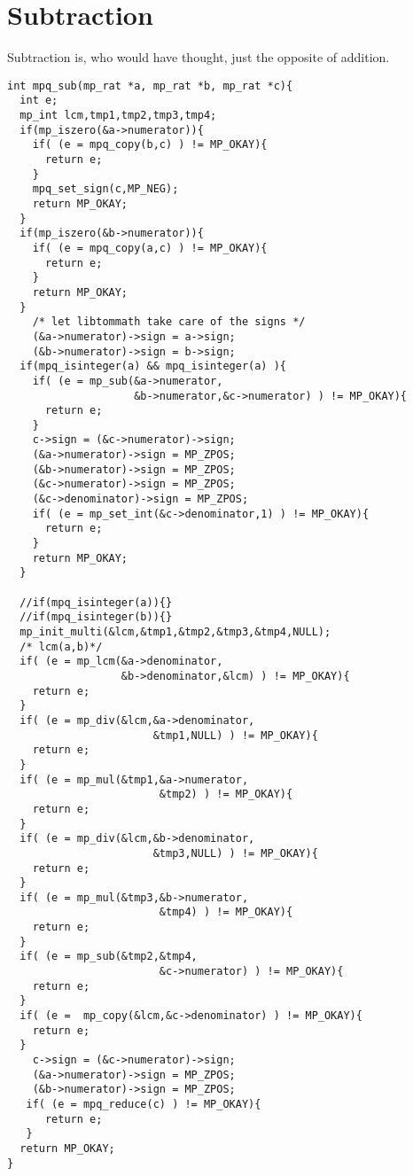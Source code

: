 \documentclass[10pt]{book}
\theoremstyle{definition}
\theoremstyle{remark}
\begin{document}
\section{Subtraction}
Subtraction is, who would have thought, just the opposite of addition.
 \begin{center}
    \begin{lstlisting}[caption={Subtraction},label=subrat]
int mpq_sub(mp_rat *a, mp_rat *b, mp_rat *c){
  int e;
  mp_int lcm,tmp1,tmp2,tmp3,tmp4;
  if(mp_iszero(&a->numerator)){
    if( (e = mpq_copy(b,c) ) != MP_OKAY){
      return e;
    }
    mpq_set_sign(c,MP_NEG);
    return MP_OKAY;
  }
  if(mp_iszero(&b->numerator)){
    if( (e = mpq_copy(a,c) ) != MP_OKAY){
      return e;
    }
    return MP_OKAY;
  }
    /* let libtommath take care of the signs */
    (&a->numerator)->sign = a->sign;
    (&b->numerator)->sign = b->sign;
  if(mpq_isinteger(a) && mpq_isinteger(a) ){
    if( (e = mp_sub(&a->numerator,
                    &b->numerator,&c->numerator) ) != MP_OKAY){
      return e;
    }
    c->sign = (&c->numerator)->sign;
    (&a->numerator)->sign = MP_ZPOS;
    (&b->numerator)->sign = MP_ZPOS;
    (&c->numerator)->sign = MP_ZPOS;
    (&c->denominator)->sign = MP_ZPOS;
    if( (e = mp_set_int(&c->denominator,1) ) != MP_OKAY){
      return e;
    }
    return MP_OKAY;
  }

  //if(mpq_isinteger(a)){}
  //if(mpq_isinteger(b)){}
  mp_init_multi(&lcm,&tmp1,&tmp2,&tmp3,&tmp4,NULL);
  /* lcm(a,b)*/
  if( (e = mp_lcm(&a->denominator,
                  &b->denominator,&lcm) ) != MP_OKAY){
    return e;
  }
  if( (e = mp_div(&lcm,&a->denominator,
                       &tmp1,NULL) ) != MP_OKAY){
    return e;
  }
  if( (e = mp_mul(&tmp1,&a->numerator,
                        &tmp2) ) != MP_OKAY){
    return e;
  }
  if( (e = mp_div(&lcm,&b->denominator,
                       &tmp3,NULL) ) != MP_OKAY){
    return e;
  }
  if( (e = mp_mul(&tmp3,&b->numerator,
                        &tmp4) ) != MP_OKAY){
    return e;
  }
  if( (e = mp_sub(&tmp2,&tmp4,
                        &c->numerator) ) != MP_OKAY){
    return e;
  }
  if( (e =  mp_copy(&lcm,&c->denominator) ) != MP_OKAY){
    return e;
  }
    c->sign = (&c->numerator)->sign;
    (&a->numerator)->sign = MP_ZPOS;
    (&b->numerator)->sign = MP_ZPOS;
   if( (e = mpq_reduce(c) ) != MP_OKAY){
      return e;
   }
  return MP_OKAY;
}
    \end{lstlisting}
  \end{center}
\end{document}
